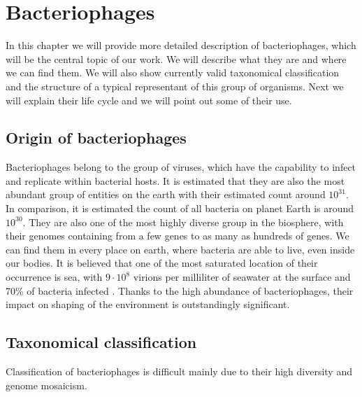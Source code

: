 \chapter{Bacteriophages}
In this chapter we will provide more detailed description of bacteriophages, which will be the central topic of our work.
We will describe what they are and where we can find them.
We will also show currently valid taxonomical classification and the structure of a typical representant of this group of organisms.
Next we will explain their life cycle and we will point out some of their use.

\section{Origin of bacteriophages}
Bacteriophages belong to the group of viruses, which have the capability to infect and replicate within bacterial hosts.
It is estimated that they are also the most abundant group of entities on the earth with their estimated count around $10^{31}$.
In comparison, it is estimated the count of all bacteria on planet Earth is around $10^{30}$.
They are also one of the most highly diverse group in the biosphere, with their genomes containing from a few genes to as many as hundreds of genes.
We can find them in every place on earth, where bacteria are able to live, even inside our bodies.
It is believed that one of the most saturated location of their occurrence is sea, with  $9\cdot 10^8$ virions per milliliter of seawater at the surface and 70\% of bacteria infected \cite{virioplankton}. %
Thanks to the high abundance of bacteriophages, their impact on shaping of the environment is outstandingly significant.

\section{Taxonomical classification}
Classification of bacteriophages is difficult mainly due to their high diversity and genome mosaicism. \cite{phagetax}


